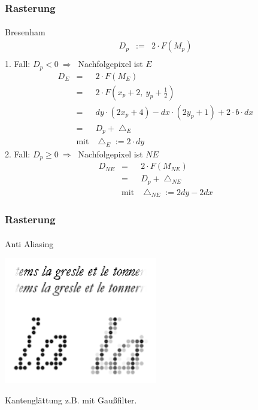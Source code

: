 \documentclass{beamer}
\begin{document}
\begin{frame}
    \frametitle{Rasterung}
\framesubtitle{}
\begin{block}{Bresenham}
\begin{equation*}\begin{matrix}
        D_p & := & 2 \cdot F\left(M_p\right) \\
         \end{matrix}\end{equation*}
    1. Fall: $D_p < 0 ~\Rightarrow~$ Nachfolgepixel ist $E$
    \begin{equation*}\begin{matrix}
        D_E & = & 2 \cdot F\left(M_E\right) \\
        & = & 2 \cdot F\left(x_p + 2,~ y_p + \frac{1}{2}\right) \\
        & = & dy \cdot \left(2 x_p + 4\right) 
            - dx \cdot \left(2 y_p + 1\right) 
            + 2 \cdot b \cdot dx \\
        & = & D_p + \bigtriangleup_E \\
        & \textrm{mit} & \bigtriangleup_E := 2 \cdot dy
    \end{matrix}\end{equation*}
    2. Fall: $D_p \ge 0 ~\Rightarrow~$ Nachfolgepixel ist $NE$ \\
    \begin{equation*}\begin{matrix}
        D_{NE} & = & 2 \cdot F\left( M_{NE} \right) \\
        & = & D_p + \bigtriangleup_{NE} \\
        & \textrm{mit} & \bigtriangleup_{NE} := 2dy - 2dx
    \end{matrix}\end{equation*}
\end{block}
\end{frame}



\begin{frame}
    \frametitle{Rasterung}
\framesubtitle{}
\begin{block}{Anti Aliasing}

\begin{center}
    \includegraphics[width=0.5\textwidth]{images/Antialiasing}
\end{center}
Kantenglättung z.B. mit Gaußfilter.
\end{block}
\end{frame}
\end{document}
